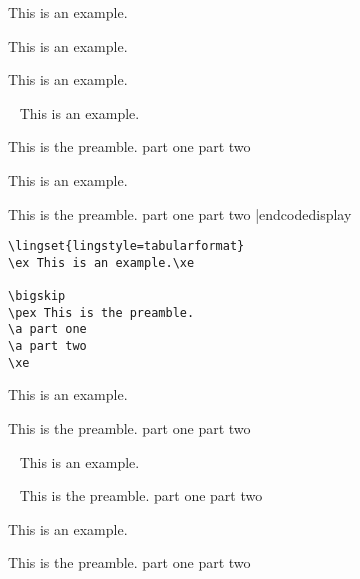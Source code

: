 \bye
{}
\xe

\bigskip

\ex[exno=216] This is an example.

\xe

\bigskip

\ex This is an example.

\xe

\bigskip

\ex[exno=218] This is an example.

\xe

\bye

%
%
%
%
\bye
\codedisplay~
\ex This is an example.\xe

\pex This is the preamble.
\a part one
\a part two
\xe

\ex This is an example.\xe

\pex This is the preamble.
\a part one
\a part two
\xe
|endcodedisplay
\hfil
\bye
\begin{verbatim}\lingset{lingstyle=tabularformat}
\ex This is an example.\xe

\bigskip
\pex This is the preamble.
\a part one
\a part two
\xe\end{verbatim}


\ex This is an example.\xe

\bigskip
\pex This is the preamble.
\a part one
\a part two
\xe

\ex~ This is an example.\xe

\pex~ This is the preamble.
\a part one
\a part two
\xe
\resetexcnt
\hfil


\ex This is an example.\xe

\pex
This is the preamble.
\a part one
\a part two
\xe

\hfil


